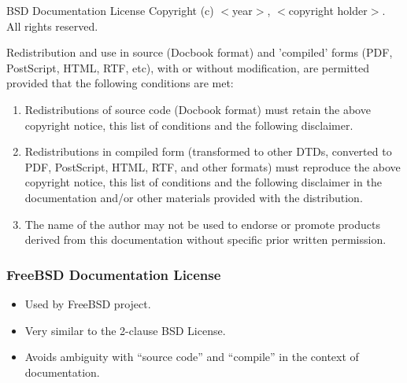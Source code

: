 
\begin{frame}

\small

\begin{block}{BSD Documentation License} 
Copyright (c) $<$year$>$, $<$copyright holder$>$. All rights reserved. \\

\smallskip

Redistribution and use in source (Docbook format) and 'compiled' forms
(PDF, PostScript, HTML, RTF, etc), with or without modification, are
permitted provided that the following conditions are met:

\begin{enumerate}
\item Redistributions of source code (Docbook format) must retain the
above copyright notice, this list of conditions and the following
disclaimer.
\item Redistributions in compiled form (transformed to other DTDs,
converted to PDF, PostScript, HTML, RTF, and other formats) must
reproduce the above copyright notice, this list of conditions and the
following disclaimer in the documentation and/or other materials
provided with the distribution.
\item The name of the author may not be used to endorse or promote
products derived from this documentation without specific prior
written permission.
\end{enumerate}
 
\end{block}

\end{frame}


\begin{frame}
\frametitle {FreeBSD Documentation License}


\begin{itemize}
\item Used by FreeBSD project.
\item Very similar to the 2-clause BSD License.
\item Avoids ambiguity with ``source code'' and ``compile'' in the context of documentation.
\end{itemize}

\end{frame}

